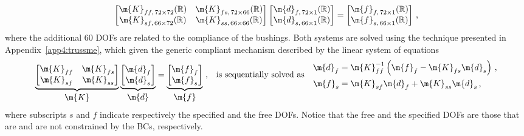 \begin{equation*}
  \begin{bmatrix}
    \m{K}_{ff ,\, 72 \times 72}(\mathbb{R}) & \m{K}_{fs ,\, 72 \times 66}(\mathbb{R}) \\
    \m{K}_{sf ,\, 66 \times 72}(\mathbb{R}) & \m{K}_{ss ,\, 66 \times 66}(\mathbb{R})
  \end{bmatrix} \begin{bmatrix}
    \m{d}_{f ,\, 72 \times 1}(\mathbb{R}) \\ \m{d}_{s ,\, 66 \times 1}(\mathbb{R})
  \end{bmatrix} = \begin{bmatrix}
    \m{f}_{f ,\, 72 \times 1}(\mathbb{R}) \\ \m{f}_{s ,\, 66 \times 1}(\mathbb{R})
  \end{bmatrix}
  \, \text{,}
\end{equation*}
%
where the additional 60 \acp{DOF} are related to the compliance of the bushings. Both systems are solved using the technique presented in Appendix~\ref{app4:trussme}, which given the generic compliant mechanism described by the linear system of equations
%
\begin{equation}
  \label{chap5:eq:macrofe}
  \underbrace{\begin{bmatrix}
    \m{K}_{ff} & \m{K}_{fs} \\
    \m{K}_{sf} & \m{K}_{ss}
  \end{bmatrix}}_{\textstyle\m{K}} \underbrace{\begin{bmatrix}
    \m{d}_{f} \\ \m{d}_{s}
  \end{bmatrix}}_{\textstyle\m{d}} = \underbrace{\begin{bmatrix}
    \m{f}_{f} \\ \m{f}_{s}
  \end{bmatrix}}_{\textstyle\m{f}} \, \text{,}
  \quad \text{is sequentially solved as} \quad
  \begin{aligned}
    \m{d}_{f} &= \m{K}_{ff}^{-1}\left(\m{f}_{f} - \m{K}_{fs}\m{d}_{s}\right) \, \text{,} \\
    \m{f}_{s} &= \m{K}_{sf}\m{d}_{f} + \m{K}_{ss}\m{d}_{s} \, \text{,}
  \end{aligned}
\end{equation}
%
where subscripts $s$ and $f$ indicate respectively the specified and the free \acp{DOF}. Notice that the free and the specified \acp{DOF} are those that are and are not constrained by the \acp{BC}, respectively.

